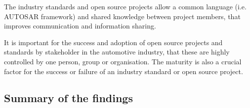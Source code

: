  The industry standards and open source projects allow a common language (i.e. AUTOSAR framework) and shared knowledge between project members, that improves communication and information sharing.

 It is important for the success and adoption of open source projects and standards by stakeholder in the automotive industry, that these are highly controlled by one person, group or organisation. The maturity is also a crucial factor for the success or failure of an industry standard or open source project.



\subsection{Summary of the findings}\label{sec:findings_RQs}





%

